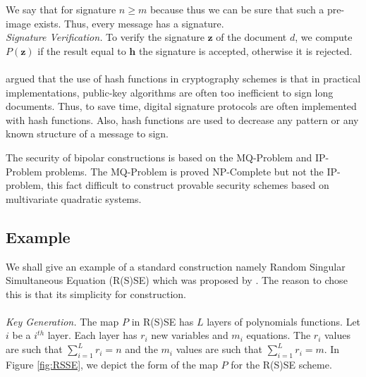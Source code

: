We say that for signature $n \geq m$ because thus we can be sure that such a pre-image exists.
Thus, every message has a signature.\\
\noindent
\textit{Signature Verification.} To verify the  signature $\boldsymbol{z}$ of the document $d$, we compute $P(\boldsymbol{z})$ if the result equal to $\boldsymbol{h}$ the signature is accepted, otherwise it is rejected.\\
\noindent\\
\noindent
\cite{Schneier1995} argued that the use of  hash functions in cryptography schemes 
is that in practical implementations, public-key algorithms are often too inefficient to sign long documents. Thus, to save time, digital signature protocols are often implemented with hash functions. Also, hash functions are used to decrease any pattern or any known structure of a message to sign. 

The security of bipolar constructions is based on the MQ-Problem and IP-Problem problems. The MQ-Problem is proved NP-Complete but not the IP-problem, this fact difficult to construct provable security schemes based on multivariate quadratic systems.
\subsection{Example}
We shall give an example of a standard construction namely Random Singular Simultaneous Equation (R(S)SE) which was proposed by \citet{KasaharaS04}. The reason to chose this is that its simplicity for construction.\\\\
\noindent
\textit{Key Generation.} The map $P$ in R(S)SE has $L$ layers of polynomials functions. Let $i$ be a $i^{th}$ layer. Each layer has $r_i$ new variables and $m_i$ equations. The $r_i$ values are such that $\sum_{i=1}^{L}r_i=n$ and the $m_i$ values are such that $\sum_{i=1}^{L}r_i=m$. In Figure \ref{fig:RSSE}, we depict the form of the map $P$ for the R(S)SE scheme. 

